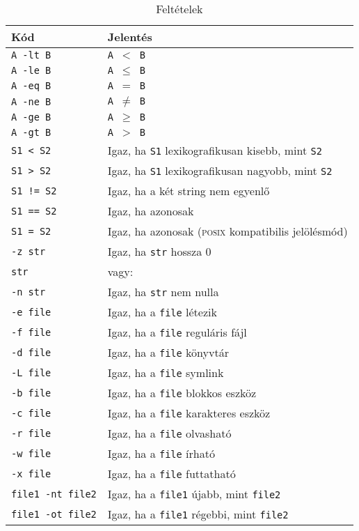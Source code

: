 \begin{table}[tbh]\center
\center\begin{tabular}{ll}\toprule
Kód & Jelentés\\\midrule
\texttt{A -lt B} & \texttt{A $<$  B}\\
\texttt{A -le B} & \texttt{A $\leq$  B}\\
\texttt{A -eq B} & \texttt{A $=$  B}\\
\texttt{A -ne B} & \texttt{A $\neq$  B}\\
\texttt{A -ge B} & \texttt{A $\geq$  B}\\
\texttt{A -gt B} & \texttt{A $>$  B}\\\midrule
\texttt{S1 < S2} & Igaz, ha \texttt{S1} lexikografikusan kisebb, mint
\texttt{S2}\\
\texttt{S1 > S2} & Igaz, ha \texttt{S1} lexikografikusan nagyobb, mint
\texttt{S2}\\
\texttt{S1 != S2} & Igaz, ha a két string nem egyenlő\\
\texttt{S1 == S2} & Igaz, ha azonosak\\
\texttt{S1 = S2} & Igaz, ha azonosak (\textsc{posix} kompatibilis jelölésmód)\\
\texttt{-z str} & Igaz, ha \texttt{str} hossza 0\\
\texttt{str} & vagy:\\
\texttt{-n str} & Igaz, ha \texttt{str} nem nulla\\\midrule
\texttt{-e file} & Igaz, ha a \texttt{file} létezik\\
\texttt{-f file} & Igaz, ha a \texttt{file} reguláris fájl\\
\texttt{-d file} & Igaz, ha a \texttt{file} könyvtár\\
\texttt{-L file} & Igaz, ha a \texttt{file} symlink\\
\texttt{-b file} & Igaz, ha a \texttt{file} blokkos eszköz\\
\texttt{-c file} & Igaz, ha a \texttt{file} karakteres eszköz \\
\texttt{-r file} & Igaz, ha a \texttt{file} olvasható\\
\texttt{-w file} & Igaz, ha a \texttt{file} írható\\
\texttt{-x file} & Igaz, ha a \texttt{file} futtatható\\
\texttt{file1 -nt file2} & Igaz, ha a \texttt{file1} újabb,
 mint \texttt{file2}\\
\texttt{file1 -ot file2} & Igaz, ha a \texttt{file1} régebbi,
 mint \texttt{file2}\\

\bottomrule
\end{tabular}
 \caption{Feltételek}
  \label{table:vez-feltetelek}
\end{table}


